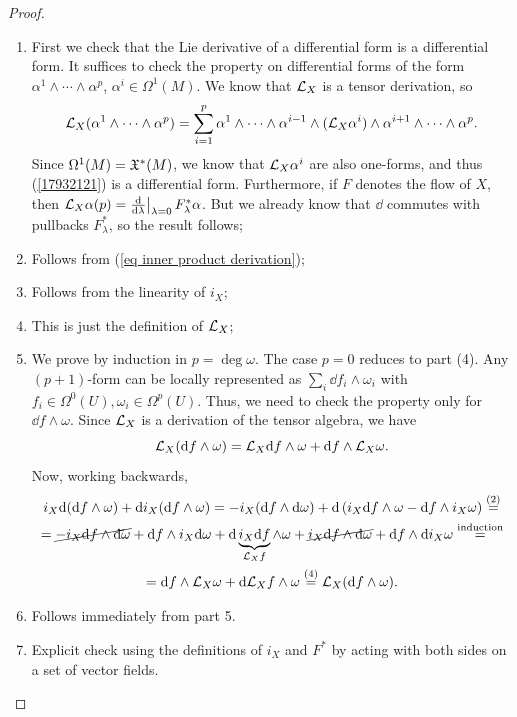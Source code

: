 \begin{proof}
\begin{enumerate}
    \item First we check that the Lie derivative of a differential form is a differential form. It suffices to check the property on differential forms of the form $\alpha^1\wedge\cdots\wedge\alpha^p$, $\alpha^i\in\Omega^1(M)$. We know that $\mathcal{L}_X$ is a tensor derivation, so 
    \[\mathcal{L}_X (\alpha^1\wedge\cdots\wedge\alpha^p)=\sum_{i=1}^p \alpha^1\wedge\cdots\wedge\alpha^{i-1}\wedge(\mathcal{L}_X\alpha^i)\wedge\alpha^{i+1}\wedge\cdots\wedge\alpha^p.\label{17932121}\]
    Since $\Omega^1(M)=\mathfrak{X}^\ast(M)$, we know that $\mathcal{L}_X \alpha^i$ are also one-forms, and thus (\ref{17932121}) is a differential form.
    Furthermore, if $F$ denotes the flow of $X$, then $\Lie_X\alpha (p)=\restr{\frac{\dd}{\dd\lambda}}{\lambda=0}F^\ast_\lambda \alpha$. But we already know that $\dd$ commutes with pullbacks $F^\ast_\lambda$, so the result follows;
    \item Follows from (\ref{eq inner product derivation});
    \item Follows from the linearity of $i_X$;
    \item This is just the definition of $\mathcal{L}_X$;
    \item We prove by induction in $p=\deg\omega$. The case $p=0$ reduces to part (4). Any $(p+1)$-form can be locally represented as $\sum_i \dd f_i\wedge \omega_i$ with $f_i\in\Omega^0(U), \omega_i\in \Omega^p(U)$. Thus, we need to check the property only for $\dd f\wedge \omega$. Since $\mathcal{L}_X$ is a derivation of the tensor algebra, we have
    \[\mathcal{L}_X({\mathrm{d}} f\wedge\omega)=\mathcal{L}_X {\mathrm{d}} f\wedge \omega+{\mathrm{d}} f\wedge \mathcal{L}_X\omega.\]
    Now, working backwards,
    \begin{multline}
        i_X{\mathrm{d}} ({\mathrm{d}} f\wedge \omega)+ {\mathrm{d}} i_X ({\mathrm{d}} f\wedge\omega)=-i_X({\mathrm{d}} f\wedge{\mathrm{d}} \omega)+{\mathrm{d}}\left(i_X{\mathrm{d}} f\wedge\omega-{\mathrm{d}} f\wedge i_X\omega\right)\overset{(2)}{=}
        \\
        =\cancel{-i_X{\mathrm{d}} f\wedge{\mathrm{d}} \omega}+{\mathrm{d}} f\wedge i_X{\mathrm{d}}\omega +{\mathrm{d}} \underbrace{i_X {\mathrm{d}} f}_{\mathcal{L}_X f}\wedge\omega+\cancel{i_X{\mathrm{d}} f\wedge{\mathrm{d}} \omega}+{\mathrm{d}} f\wedge {\mathrm{d}} i_X\omega\overset{\text{induction}}{=}
        \\
        ={\mathrm{d}} f\wedge \mathcal{L}_X\omega +{\mathrm{d}} \mathcal{L}_X f\wedge \omega\overset{(4)}{=}\mathcal{L}_X({\mathrm{d}} f\wedge\omega).
    \end{multline}
    \item Follows immediately from part 5.
    \item Explicit check using the definitions of $i_X$ and $F^\ast$ by acting with both sides on a set of vector fields.
\end{enumerate}
\end{proof}

